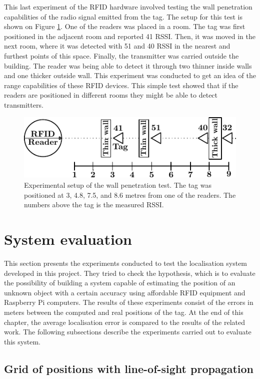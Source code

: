 This last experiment of the RFID hardware involved testing the wall penetration capabilities of the radio signal emitted from the tag. The setup for this test is shown on Figure \ref{fig:pene}. One of the readers was placed in a room. The tag was first positioned in the adjacent room and reported 41 RSSI. Then, it was moved in the next room, where it was detected with 51 and 40 RSSI in the nearest and furthest points of this space. Finally, the transmitter was carried outside the building. The reader was being able to detect it through two thinner inside walls and one thicker outside wall. This experiment was conducted to get an idea of the range capabilities of these RFID devices. This simple test showed that if the readers are positioned in different rooms they might be able to detect transmitters. 
\begin{figure}[h]
	\begin{center}
		\includegraphics[width=.6\textwidth]{figures/exp/penetration}
		\caption{Experimental setup of the wall penetration test. The tag was positioned at 3, 4.8, 7.5, and 8.6 metres from one of the readers. The numbers above the tag is the measured RSSI.}
		\label{fig:pene}
	\end{center}
\end{figure}


\section{System evaluation}
\label{sec:syseval}

This section presents the experiments conducted to test the localisation system developed in this project. They tried to check the hypothesis, which is to evaluate the possibility of building a system capable of estimating the position of an unknown object with a certain accuracy using affordable RFID equipment and Raspberry Pi computers. The results of these experiments consist of the errors in meters between the computed and real positions of the tag. At the end of this chapter, the average localisation error is compared to the results of the related work. The following subsections describe the experiments carried out to evaluate this system.


\subsection{Grid of positions with line-of-sight propagation}

